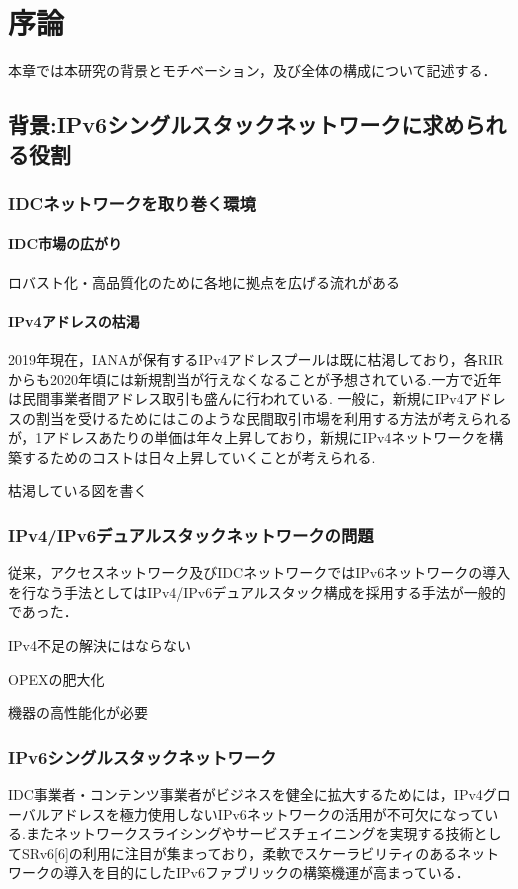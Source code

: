 \chapter{序論}
\label{introduction}
本章では本研究の背景とモチベーション，及び全体の構成について記述する．

\section{背景:IPv6シングルスタックネットワークに求められる役割}
\label{introduction:background}

\subsection{IDCネットワークを取り巻く環境}
\subsubsection{IDC市場の広がり}
ロバスト化・高品質化のために各地に拠点を広げる流れがある

\subsubsection{IPv4アドレスの枯渇}
2019年現在，IANAが保有するIPv4アドレスプールは既に枯渇しており，各RIRからも2020年頃には新規割当が行えなくなることが予想されている.一方で近年は民間事業者間アドレス取引も盛んに行われている.
一般に，新規にIPv4アドレスの割当を受けるためにはこのような民間取引市場を利用する方法が考えられるが，1アドレスあたりの単価は年々上昇しており，新規にIPv4ネットワークを構築するためのコストは日々上昇していくことが考えられる.

枯渇している図を書く

\subsection{IPv4/IPv6デュアルスタックネットワークの問題}
\label{introduction:background:dualstack_problems}
従来，アクセスネットワーク及びIDCネットワークではIPv6ネットワークの導入を行なう手法としてはIPv4/IPv6デュアルスタック構成を採用する手法が一般的であった．


IPv4不足の解決にはならない

OPEXの肥大化

機器の高性能化が必要


\subsection{IPv6シングルスタックネットワーク}
\label{introduction:background:IPv6-single-stack-network}
IDC事業者・コンテンツ事業者がビジネスを健全に拡大するためには，IPv4グローバルアドレスを極力使用しないIPv6ネットワークの活用が不可欠になっている.またネットワークスライシングやサービスチェイニングを実現する技術としてSRv6[6]の利用に注目が集まっており，柔軟でスケーラビリティのあるネットワークの導入を目的にしたIPv6ファブリックの構築機運が高まっている．

